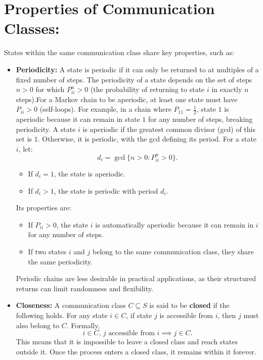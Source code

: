 \section{Properties of Communication Classes:}
States within the same communication class share key properties, such as:
\begin{itemize}
    \item \textbf{Periodicity:} A state is periodic if it can only be returned to at multiples of a fixed number of steps. The periodicity of a state depends on the set of steps \( n > 0 \) for which \( P_{ii}^n > 0 \) (the probability of returning to state \( i \) in exactly \( n \) steps).For a Markov chain to be aperiodic, at least one state must have \( P_{ii} > 0 \) (self-loops). For example, in a chain where \( P_{11} = \frac{1}{2} \), state \( 1 \) is aperiodic because it can remain in state \( 1 \) for any number of steps, breaking periodicity. A state \( i \) is aperiodic if the greatest common divisor (gcd) of this set is \( 1 \). Otherwise, it is periodic, with the gcd defining its period. \newline 
    For a state \( i \), let:
    \[
    d_i = \gcd\{n > 0 : P_{ii}^n > 0\}.
    \]
        \begin{itemize}
            \item If \( d_i = 1 \), the state is aperiodic.
            \item If \( d_i > 1 \), the state is periodic with period \( d_i \).
        \end{itemize}
    Its properties are:  
        \begin{itemize}
            \item If \( P_{ii} > 0 \), the state \( i \) is automatically aperiodic because it can remain in \( i \) for any number of steps.
            \item If two states \( i \) and \( j \) belong to the same communication class, they share the same periodicity.
        \end{itemize}
     Periodic chains are less desirable in practical applications, as their structured returns can limit randomness and flexibility.

    \item \textbf{Closeness:} A communication class \( C \subseteq S \) is said to be \textbf{closed} if the following holds. For any state \( i \in C \), if state \( j \) is accessible from \( i \), then \( j \) must also belong to \( C \). Formally,  
    \[
    i \in C, \, j \text{ accessible from } i \implies j \in C.
    \]
    This means that it is impossible to leave a closed class and reach states outside it. Once the process enters a closed class, it remains within it forever. 
    

\end{itemize}

